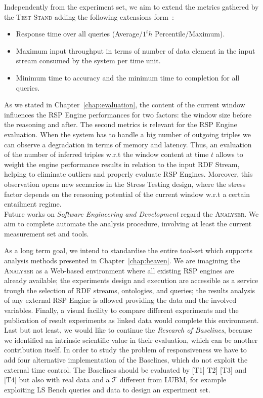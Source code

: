 Independently from the experiment set, we aim to extend the metrics gathered by the \textsc{Test Stand} adding the following extensions form~\cite{DBLP:conf/esws/ScharrenbachUMVB13}:
\begin{itemize}
\item Response time over all queries (Average/$1^th$ Percentile/Maximum).
\item Maximum input throughput in terms of number of data element in the input stream consumed by the system per time unit.
\item Minimum time to accuracy and the minimum time to completion for all queries.
\end{itemize}

As we stated in Chapter~\ref{chap:evaluation}, the content of the current window influences the RSP Engine performances for two factors: the window size before the reasoning and after. The second metrics is relevant for the RSP Engine evaluation. When the system has to handle a big number of outgoing triples we can observe a degradation in terms of memory and latency. Thus, an evaluation of the number of inferred triples w.r.t the window content at time $t$ allows to weight the engine performance results in relation to the input RDF Stream, helping to eliminate outliers and properly evaluate RSP Engines. Moreover, this observation opens new scenarios in the Stress Testing design, where the stress factor depends on the reasoning potential of the current window w.r.t a certain entailment regime.\\

\noindent Future works on \textit{Software Engineering and Development} regard the \textsc{Analyser}.  We aim to complete automate the analysis procedure, involving at least the current measurement set and tools. 

As a long term goal, we intend to standardise the entire tool-set which supports analysis methods presented in Chapter~\ref{chap:heaven}. We are imagining the \textsc{Analyser} as a Web-based environment where all existing RSP engines are already available; the experiments design and execution are accessible as a service trough the selection of RDF streams, ontologies, and queries; the results analysis of any external RSP Engine is allowed providing the data and the involved variables. Finally, a visual facility to compare different experiments and the publication of result experiments as linked data would complete this environment. \\


\noindent Last but not least, we would like to continue the \textit{Research of Baselines}, because we identified an intrinsic scientific value in their evaluation, which can be another contribution itself. In order to study the problem of responsiveness we have to add four alternative implementation of the Baselines, which do not exploit the external time control. The Baselines should be evaluated by [T1] T2] [T3] and [T4] but also with real data and a $\mathcal{T}$ different from LUBM, for example exploiting LS Bench queries and data to design an experiment set. 
